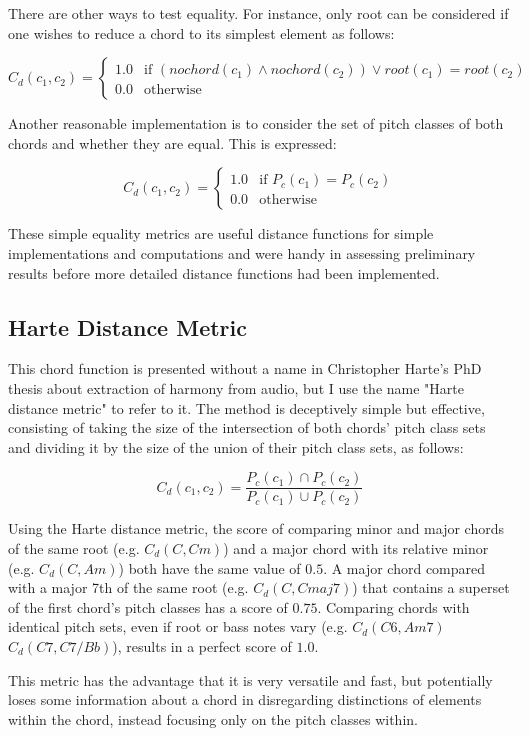 There are other ways to test equality. For instance, only root can be considered if one wishes to reduce a chord to its simplest element as follows:

\[ C_d(c_1,c_2) = \begin{cases} 1.0 & \text{if }(nochord(c_1) \land nochord(c_2)) \lor root(c_1) = root(c_2) \\ 0.0 & \text{otherwise} \end{cases} \]

Another reasonable implementation is to consider the set of pitch classes of both chords and whether they are equal. This is expressed:

\[ C_d(c_1,c_2) = \begin{cases} 1.0 & \text{if }P_c(c_1) = P_c(c_2) \\ 0.0 & \text{otherwise} \end{cases} \]

These simple equality metrics are useful distance functions for simple implementations and computations and were handy in assessing preliminary results before more detailed distance functions had been implemented.

\subsection{Harte Distance Metric}

This chord function is presented without a name in Christopher Harte's PhD thesis about extraction of harmony from audio\cite{harte2010towards}, but I use the name "Harte distance metric" to refer to it. The method is deceptively simple but effective, consisting of taking the size of the intersection of both chords' pitch class sets and dividing it by the size of the union of their pitch class sets, as follows:

\[ C_d(c_1, c_2) = \frac{P_c(c_1) \cap P_c(c_2)}{P_c(c_1) \cup P_c(c_2)} \]

Using the Harte distance metric, the score of comparing minor and major chords of the same root (e.g. $C_d(C,Cm)$) and a major chord with its relative minor (e.g. $C_d(C,Am)$) both have the same value of $0.5$. A major chord compared with a major 7th of the same root (e.g. $C_d(C,Cmaj7)$) that contains a superset of the first chord's pitch classes has a score of $0.75$. Comparing chords with identical pitch sets, even if root or bass notes vary (e.g. $C_d(C6, Am7)$ $C_d(C7, C7/Bb)$), results in a perfect score of $1.0$.

This metric has the advantage that it is very versatile and fast, but potentially loses some information about a chord in disregarding distinctions of elements within the chord, instead focusing only on the pitch classes within.


